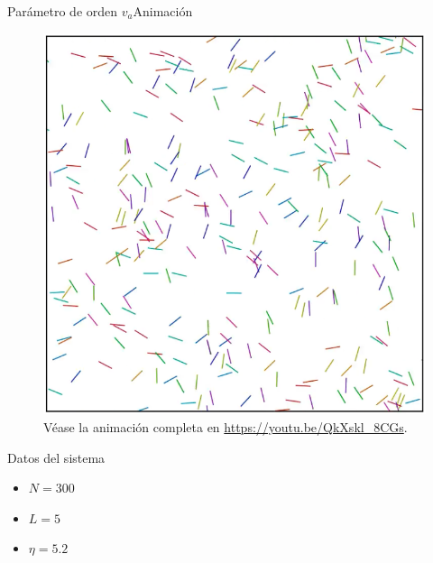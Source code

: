 \documentclass{beamer}
\begin{document}
            \begin{frame}{Parámetro de orden $v_a$}{Animación}
                \begin{minipage}[t]{0.60\textwidth}
                    \begin{figure}[H!]
                        \includegraphics[height=.65\textheight]{./animation-n300-eta5p2-frame}
                        \caption*{Véase la animación completa en \url{https://youtu.be/QkXskl_8CGs}.}
                        \label{fig:va_3}
                    \end{figure}
                \end{minipage}
                \hfill
                \begin{minipage}[t]{0.30\textwidth}
                    \begin{block}{Datos del sistema}
                        \begin{itemize}
                            \item $N=300$
                            \item $L=5$
                            \item $\eta=5.2$
                        \end{itemize}
                    \end{block}
                \end{minipage}
            \end{frame}
\end{document}
